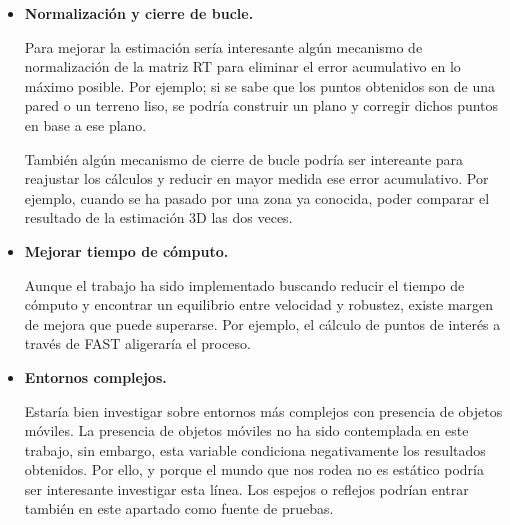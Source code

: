 \begin{itemize}
\item \textbf{Normalización y cierre de bucle.}

Para mejorar la estimación sería interesante algún mecanismo de normalización de la matriz RT para eliminar el error acumulativo en lo máximo posible. Por ejemplo; si se sabe que los puntos obtenidos son de una pared o un terreno liso, se podría construir un plano y corregir dichos puntos en base a ese plano.

También algún mecanismo de cierre de bucle podría ser intereante para reajustar los cálculos y reducir en mayor medida ese error acumulativo. Por ejemplo, cuando se ha pasado por una zona ya conocida, poder comparar el resultado de la estimación 3D las dos veces.

\item \textbf{Mejorar tiempo de cómputo.}

Aunque el trabajo ha sido implementado buscando reducir el tiempo de cómputo y encontrar un equilibrio entre velocidad y robustez, existe margen de mejora que puede superarse. Por ejemplo, el cálculo de puntos de interés a través de FAST aligeraría el proceso.

\item \textbf{Entornos complejos.}

Estaría bien investigar sobre entornos más complejos con presencia de objetos móviles. La presencia de objetos móviles no ha sido contemplada en este trabajo, sin embargo, esta variable condiciona negativamente los resultados obtenidos. Por ello, y porque el mundo que nos rodea no es estático podría ser interesante investigar esta línea. Los espejos o reflejos podrían entrar también en este apartado como fuente de pruebas.
\end{itemize}